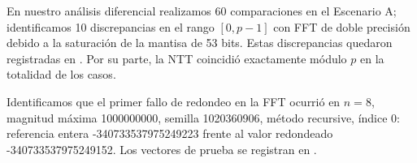 \noindent En nuestro análisis diferencial realizamos 60 comparaciones en el Escenario A; identificamos 10 discrepancias en el rango $[0,p-1]$ con FFT de doble precisión debido a la saturación de la mantisa de 53 bits. Estas discrepancias quedaron registradas en . Por su parte, la NTT coincidió exactamente módulo $p$ en la totalidad de los casos.\par


\noindent Identificamos que el primer fallo de redondeo en la FFT ocurrió en $n=8$, magnitud máxima 1000000000, semilla 1020360906, método recursive, índice 0: referencia entera -340733537975249223 frente al valor redondeado -340733537975249152. Los vectores de prueba se registran en .\par
